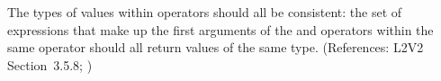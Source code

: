 The types of values within  operators should all
be consistent: the set of expressions that make up the first
arguments of the  and  operators
within the same  operator should all return
values of the same type.  (References: L2V2 Section~3.5.8; )
